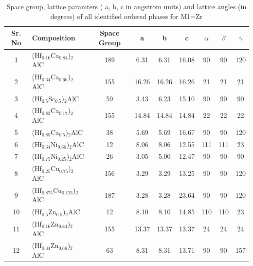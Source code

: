 \documentclass[preprint,amsmath,amssymb,aps, prb,showkeys]{revtex4-1}
\begin{document}
\begin{table}[htp!]
\centering
\setlength{\tabcolsep}{0.2cm}
\setlength\extrarowheight{6pt}
\begin{tabular}{clccccccc}
\hline
Sr. No & Composition                       & Space Group & a     & b     & c     & $\alpha$ & $\beta$ & $\gamma$ \\
\hline \hline

1     & (Hf$_{0.16}$Ca$_{0.84}$)$_2$AlC   & 189         & 6.31  & 6.31  & 16.08 & 90       & 90      & 120      \\
2     & (Hf$_{0.34}$Ca$_{0.66}$)$_2$AlC   & 155         & 16.26 & 16.26 & 16.26 & 21       & 21      & 21       \\
3     & (Hf$_{0.5}$Sc$_{0.5}$)$_2$AlC     & 59          & 3.43  & 6.23  & 15.10 & 90       & 90      & 90       \\
4     & (Hf$_{0.83}$Ca$_{0.17}$)$_2$AlC   & 155         & 14.84 & 14.84 & 14.84 & 22       & 22      & 22       \\
5     & (Hf$_{0.85}$Ca$_{0.5}$)$_2$AlC    & 38          & 5.69  & 5.69  & 16.67 & 90       & 90      & 120      \\
6     & (Hf$_{0.34}$Ni$_{0.66}$)$_2$AlC   & 12          & 8.06  & 8.06  & 12.55 & 111      & 111     & 23       \\
7     & (Hf$_{0.75}$Ni$_{0.25}$)$_2$AlC   & 26          & 3.05  & 5.00  & 12.47 & 90       & 90      & 90       \\
8     & (Hf$_{0.25}$Cu$_{0.75}$)$_2$AlC   & 156         & 3.29  & 3.29  & 13.25 & 90       & 90      & 120      \\
9     & (Hf$_{0.875}$Cu$_{0.125}$)$_2$AlC & 187         & 3.28  & 3.28  & 23.64 & 90       & 90      & 120      \\
10    & (Hf$_{0.5}$Zn$_{0.5}$)$_2$AlC     & 12          & 8.10  & 8.10  & 14.85 & 110      & 110     & 23       \\
11    & (Hf$_{0.16}$Zn$_{0.84}$)$_2$AlC   & 155         & 13.37 & 13.37 & 13.37 & 24       & 24      & 24       \\
12    & (Hf$_{0.34}$Zn$_{0.66}$)$_2$AlC   & 63          & 8.31  & 8.31  & 13.71 & 90       & 90      & 157      \\
\hline \hline
\end{tabular}
\caption{Space group, lattice paramters ( a, b, c in angstrom units) and lattice angles (in degrees)  of all identified ordered phases for M1=Zr}
\end{table}
\end{document}
